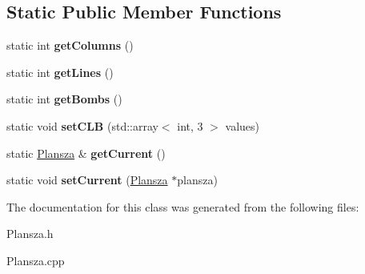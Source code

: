 \subsection*{Static Public Member Functions}
\begin{DoxyCompactItemize}
\item 
\hypertarget{class_plansza_a606c563302f64d39fa3542874aed744e}{}static int {\bfseries get\+Columns} ()\label{class_plansza_a606c563302f64d39fa3542874aed744e}

\item 
\hypertarget{class_plansza_a61d0d0599fa772b75f633089a4d3b12a}{}static int {\bfseries get\+Lines} ()\label{class_plansza_a61d0d0599fa772b75f633089a4d3b12a}

\item 
\hypertarget{class_plansza_a8d3c8a148a2b88969b04b661ca833de7}{}static int {\bfseries get\+Bombs} ()\label{class_plansza_a8d3c8a148a2b88969b04b661ca833de7}

\item 
\hypertarget{class_plansza_a9b25d696343a129d729ce30ae7f51ca5}{}static void {\bfseries set\+C\+L\+B} (std\+::array$<$ int, 3 $>$ values)\label{class_plansza_a9b25d696343a129d729ce30ae7f51ca5}

\item 
\hypertarget{class_plansza_a1d6102fbb776fbc59d83e32c425567e8}{}static \hyperlink{class_plansza}{Plansza} \& {\bfseries get\+Current} ()\label{class_plansza_a1d6102fbb776fbc59d83e32c425567e8}

\item 
\hypertarget{class_plansza_a4f2b71f1200d71fd32987b107c17dba1}{}static void {\bfseries set\+Current} (\hyperlink{class_plansza}{Plansza} $\ast$plansza)\label{class_plansza_a4f2b71f1200d71fd32987b107c17dba1}

\end{DoxyCompactItemize}


The documentation for this class was generated from the following files\+:\begin{DoxyCompactItemize}
\item 
Plansza.\+h\item 
Plansza.\+cpp\end{DoxyCompactItemize}
